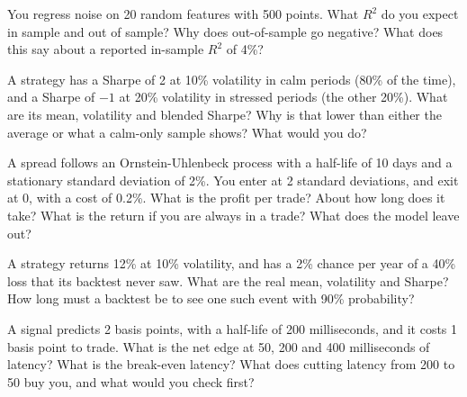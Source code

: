 \begin{question}\label{iq:iv2:research-and-strategy-cases:28}
You regress noise on 20 random features with 500 points. What $R^2$ do you expect in sample and out of sample? Why does out-of-sample go negative? What does this say about a reported in-sample $R^2$ of 4\%?
\end{question}

\begin{question}\label{iq:iv2:research-and-strategy-cases:29}
A strategy has a Sharpe of 2 at 10\% volatility in calm periods (80\% of the time), and a Sharpe of $-1$ at 20\% volatility in stressed periods (the other 20\%). What are its mean, volatility and blended Sharpe? Why is that lower than either the average or what a calm-only sample shows? What would you do?
\end{question}

\begin{question}\label{iq:iv2:research-and-strategy-cases:30}
A spread follows an Ornstein-Uhlenbeck process with a half-life of 10 days and a stationary standard deviation of 2\%. You enter at 2 standard deviations, and exit at 0, with a cost of 0.2\%. What is the profit per trade? About how long does it take? What is the return if you are always in a trade? What does the model leave out?
\end{question}

\begin{question}\label{iq:iv2:research-and-strategy-cases:31}
A strategy returns 12\% at 10\% volatility, and has a 2\% chance per year of a 40\% loss that its backtest never saw. What are the real mean, volatility and Sharpe? How long must a backtest be to see one such event with 90\% probability?
\end{question}

\begin{question}\label{iq:iv2:research-and-strategy-cases:32}
A signal predicts 2 basis points, with a half-life of 200 milliseconds, and it costs 1 basis point to trade. What is the net edge at 50, 200 and 400 milliseconds of latency? What is the break-even latency? What does cutting latency from 200 to 50 buy you, and what would you check first?
\end{question}

